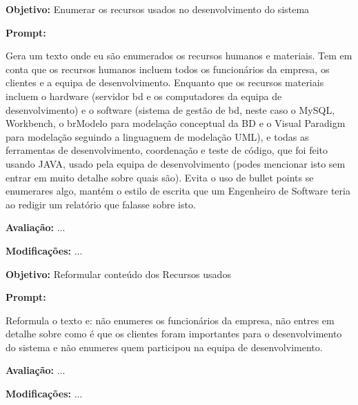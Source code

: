 \documentclass[a4paper,12pt]{scrreprt}
\begin{document}
\begin{tcolorbox}[
	title={Prompt P6 - Identificação dos Recursos},
	colback=white,
	colframe=black,
	arc=2mm,
	boxrule=0.5pt
	]
	\textbf{Objetivo:} Enumerar os recursos usados no desenvolvimento do sistema \par
	\textbf{Prompt:} 
	\begin{tcolorbox}[
		listing only,
		breakable,
		enhanced,
		colback=white,
		colframe=black,
		listing options={
			breaklines=true,
			basicstyle=\ttfamily\small
		}
		]
		Gera um texto onde eu são enumerados os recursos humanos e materiais. 
		Tem em conta que os recursos humanos incluem todos os funcionários da empresa, os clientes e a equipa de desenvolvimento. Enquanto que os recursos materiais incluem o hardware (servidor bd e os computadores da equipa de desenvolvimento) e o software (sistema de gestão de bd, neste caso o MySQL, Workbench, o brModelo para modelação conceptual da BD e o Visual Paradigm para modelação seguindo a linguaguem de modelação UML), e todas as ferramentas de desenvolvimento, coordenação e teste de código, que foi feito usando JAVA, usado pela equipa de desenvolvimento (podes mencionar isto sem entrar em muito detalhe sobre quais são). 
		Evita o uso de bullet points se enumerares algo, mantém o estilo de escrita que um Engenheiro de Software teria ao redigir um relatório que falasse sobre isto.
	\end{tcolorbox}
	\par
	\textbf{Avaliação:} ... \par
	\textbf{Modificações:} ... \par
\end{tcolorbox}

\begin{tcolorbox}[
	title={Prompt P7 - Reformulação dos Recursos},
	colback=white,
	colframe=black,
	arc=2mm,
	boxrule=0.5pt
	]
	\textbf{Objetivo:} Reformular conteúdo dos Recursos usados \par
	\textbf{Prompt:} 
	\begin{tcolorbox}[
		listing only,
		breakable,
		enhanced,
		colback=white,
		colframe=black,
		listing options={
			breaklines=true,
			basicstyle=\ttfamily\small
		}
		]
		Reformula o texto e: não enumeres os funcionários da empresa, não entres em detalhe sobre como é que os clientes foram importantes para o desenvolvimento do sistema e não enumeres quem participou na equipa de desenvolvimento.
	\end{tcolorbox}
	\par
	\textbf{Avaliação:} ... \par
	\textbf{Modificações:} ... \par
\end{tcolorbox}
\end{document}
